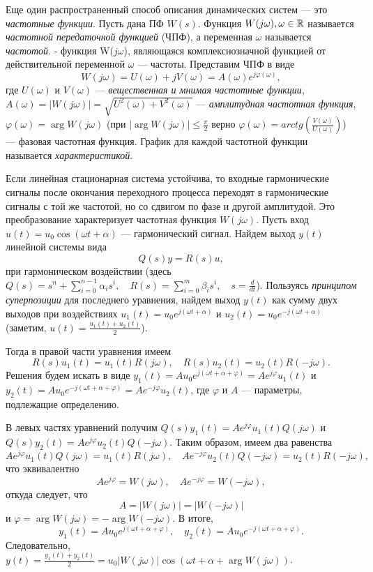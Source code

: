 \documentclass[../../TAU.tex]{subfiles}
\begin{document}
    Еще один распространенный способ описания динамических систем --- это {\it частотные функции}.
    Пусть дана ПФ $W(s)$. Функция 
    $W(j\omega), \omega\in\mathbb{R}$ 
    называется {\it частотной передаточной функцией} (ЧПФ), а переменная $\omega$ называется {\it частотой}.
     - функция W($j\omega$), являющаяся комплекснозначной функцией от действительной переменной $\omega$ --- частоты. 
    Представим ЧПФ в виде
    $$
        W(j\omega) = U(\omega) + jV(\omega) = A(\omega)e^{j\varphi(\omega)},
    $$
    где 
    $U(\omega)$ и $V(\omega)$ 
    --- {\it вещественная и мнимая частотные функции}, 
    $A(\omega) = |W(j\omega)| = \sqrt{U^2(\omega)+V^2(\omega)}$ 
    --- {\it амплитудная частотная функция}, 
    $\varphi(\omega) = \arg{W(j\omega)}$ (при 
    $|\arg{W(j\omega)}| \le \frac{\pi}{2}$ верно 
    $\varphi(\omega) = arctg\left(\frac{V(\omega)}{U(\omega)}\right)$) 
    --- фазовая частотная функция.
    График для каждой частотной функции называется {\it характеристикой}.\par
    Если линейная стационарная система устойчива, то входные гармонические сигналы после окончания переходного процесса переходят в гармонические сигналы с той же частотой, но со сдвигом по фазе и другой амплитудой. Это преобразование характеризует частотная функция 
    $W(j\omega)$.
    Пусть вход 
    $u(t) = u_0 \cos(\omega t + \alpha)$ 
    --- гармонический сигнал. Найдем выход $y(t)$ линейной системы вида
    \begin{equation}\label{EQ_ODU_SYM_2}
        Q(s)y = R(s)u,
    \end{equation}
    при гармоническом воздействии (здесь 
    $Q(s) = s^n + \sum_{i=0}^{n-1}\alpha_is^i,\quad R(s) = \sum_{i=0}^{m}\beta_is^i, \quad s=\frac{d}{dt}$). 
    Пользуясь {\it принципом суперпозиции} для последнего уравнения, найдем выход $y(t)$ как сумму двух выходов при воздействиях 
    $u_1(t) = u_0e^{j(\omega t+\alpha)}$ и 
    $u_2(t) = u_0e^{-j(\omega t+\alpha)}$ (заметим, 
    $u(t) = \frac{u_1(t)+u_2(t)}{2}$).\par
    Тогда в правой части уравнения имеем
    $$
        R(s)u_1(t) = u_1(t)R(j\omega),\quad R(s)u_2(t) = u_2(t)R(-j\omega).
    $$
    Решения будем искать в виде $y_1(t) = A u_0e^{j(\omega t + \alpha + \varphi)} = Ae^{j\varphi}u_1(t)$ и $y_2(t) = A u_0e^{-j(\omega t + \alpha + \varphi)} = Ae^{-j\varphi}u_2(t)$, где $\varphi$ и $A$ --- параметры, подлежащие определению.

    В левых частях уравнений получим $Q(s)y_1(t) = Ae^{j\varphi}u_1(t)Q(j\omega)$ и $Q(s)y_2(t) = Ae^{j\varphi}u_2(t)Q(-j\omega)$. Таким образом, имеем два равенства
    $$
        Ae^{j\varphi} u_1(t)Q(j\omega) = u_1(t)R(j\omega),\quad Ae^{-j\varphi} u_2(t)Q(-j\omega) = u_2(t)R(-j\omega),
    $$
    что эквивалентно
    $$
        Ae^{j\varphi} = W(j\omega),\quad Ae^{-j\varphi} = W(-j\omega),
    $$
    откуда следует, что 
    $$
        A = |W(j\omega)| = |W(-j\omega)|
    $$ 
    и 
    $\varphi = \arg W(j\omega) = -\arg W(-j\omega)$. В итоге,
    $$
        y_1(t) = Au_0e^{j(\omega t + \alpha + \varphi)},\quad
        y_2(t) = Au_0e^{-j(\omega t + \alpha + \varphi)}.
    $$
    Следовательно, $y(t) = \frac{y_1(t)+y_2(t)}{2} = u_0|W(j\omega)| \cos(\omega t + \alpha + \arg W(j\omega))$.
\end{document}

